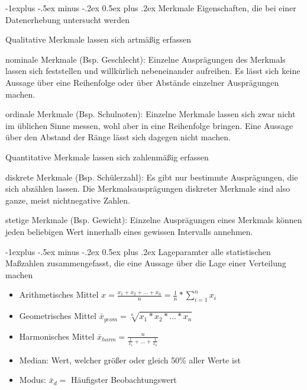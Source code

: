 \documentclass[a4paper]{article}
\makeatletter
\renewcommand{\subsection}{\@startsection{subsection}{2}{0mm}%
                                {-1explus -.5ex minus -.2ex}%
                                {0.5ex plus .2ex}%
                                {\normalfont\normalsize\bfseries}}
\makeatother
\begin{document}
\begin{multicols}{3}
  \subsection{Merkmale}
  Eigenschaften, die bei einer Datenerhebung untersucht werden
  \begin{itemize*}
    \item Qualitative Merkmale lassen sich artmäßig erfassen
    \begin{itemize*}
      \item nominale Merkmale (Bsp. Geschlecht): Einzelne Ausprägungen des Merkmals lassen sich feststellen und willkürlich nebeneinander aufreihen. Es lässt sich keine Aussage über eine Reihenfolge oder über Abstände einzelner Ausprägungen machen.
      \item ordinale Merkmale (Bsp. Schulnoten): Einzelne Merkmale lassen sich zwar nicht im üblichen Sinne messen, wohl aber in eine Reihenfolge bringen. Eine Aussage über den Abstand der Ränge lässt sich dagegen nicht machen.
    \end{itemize*}
    \item Quantitative Merkmale lassen sich zahlenmäßig erfassen
    \begin{itemize*}
      \item diskrete Merkmale (Bsp. Schülerzahl): Es gibt nur bestimmte Ausprägungen, die sich abzählen lassen. Die Merkmalsausprägungen diskreter Merkmale sind also ganze, meist nichtnegative Zahlen.
      \item stetige Merkmale (Bsp. Gewicht): Einzelne Ausprägungen eines Merkmals können jeden beliebigen Wert innerhalb eines gewissen Intervalls annehmen.
    \end{itemize*}
  \end{itemize*}

  \subsection{Lageparamter}
  alle statistischen Maßzahlen zusammengefasst, die eine Aussage über die Lage einer Verteilung machen
  \begin{itemize}
    \item Arithmetisches Mittel $x=\frac{x_1+x_2+\dots+x_n}{n}=\frac{1}{n}*\sum_{i=1}^n x_i$
    \item Geometrisches Mittel $\bar{x}_{geom} = \sqrt[n]{x_1*x_2*\dots*x_n}$
    \item Harmonisches Mittel $\bar{x}_{harm} = \frac{n}{\frac{1}{x_1}+\dots+\frac{1}{x_n}}$
    \item Median: Wert, welcher größer oder gleich 50\% aller Werte ist
    \item Modus: $\bar{x}_d=$ Häufigster Beobachtungswert
  \end{itemize}


\end{multicols}
\end{document}
